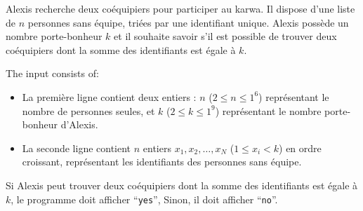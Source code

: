 \problemname{\problemyamlname}


\newcommand{\maxa}{123456789}

Alexis recherche deux coéquipiers pour participer au karwa. Il dispose d'une liste de $n$ personnes sans équipe, triées par une identifiant unique.
Alexis possède un nombre porte-bonheur $k$ et il souhaite savoir s'il est possible de trouver deux coéquipiers dont la somme des identifiants est égale à $k$.

\begin{Input}
	The input consists of:
	\begin{itemize}
		 \item La première ligne contient deux entiers : $n$ ($2 \le n \le 1^6$) représentant le nombre de personnes seules, et $k$ ($2 \le k \le 1^9$) représentant le nombre porte-bonheur d'Alexis.
		\item La seconde ligne contient $n$ entiers $x_1, x_2, \dots, x_N$ ($1 \le x_i < k$) en ordre croissant, représentant les identifiants des personnes sans équipe.
	\end{itemize}
\end{Input}

\begin{Output}
	Si Alexis peut trouver deux coéquipiers dont la somme des identifiants est égale à $k$, le programme doit afficher ``\verb|yes|'', Sinon, il doit afficher ``\verb|no|''.
\end{Output}
